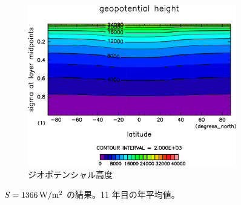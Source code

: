 \documentclass[body]{subfiles}
\begin{document}
\begin{figure}[t]
\begin{subfigure}{.4\textwidth}
		\includegraphics[width=\columnwidth]{S1366/Height,time=14600:14965-crop-rotate.pdf}
		\caption{ジオポテンシャル高度}
	\end{subfigure}
	\caption{
		\(S=1366\hmu{W/m^2}\) の結果。11 年目の年平均値。
	}\label{S1366}
\end{figure}
\end{document}
